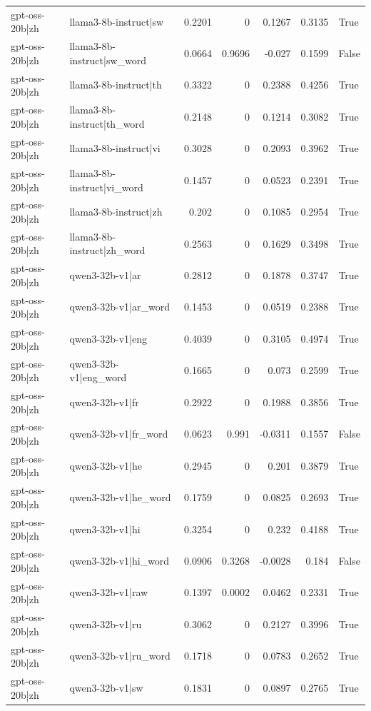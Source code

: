 \begin{table}
\begin{tabular}{l l r r r r l}
gpt-oss-20b|zh & llama3-8b-instruct|sw & 0.2201 & 0 & 0.1267 & 0.3135 & True \\
gpt-oss-20b|zh & llama3-8b-instruct|sw_word & 0.0664 & 0.9696 & -0.027 & 0.1599 & False \\
gpt-oss-20b|zh & llama3-8b-instruct|th & 0.3322 & 0 & 0.2388 & 0.4256 & True \\
gpt-oss-20b|zh & llama3-8b-instruct|th_word & 0.2148 & 0 & 0.1214 & 0.3082 & True \\
gpt-oss-20b|zh & llama3-8b-instruct|vi & 0.3028 & 0 & 0.2093 & 0.3962 & True \\
gpt-oss-20b|zh & llama3-8b-instruct|vi_word & 0.1457 & 0 & 0.0523 & 0.2391 & True \\
gpt-oss-20b|zh & llama3-8b-instruct|zh & 0.202 & 0 & 0.1085 & 0.2954 & True \\
gpt-oss-20b|zh & llama3-8b-instruct|zh_word & 0.2563 & 0 & 0.1629 & 0.3498 & True \\
gpt-oss-20b|zh & qwen3-32b-v1|ar & 0.2812 & 0 & 0.1878 & 0.3747 & True \\
gpt-oss-20b|zh & qwen3-32b-v1|ar_word & 0.1453 & 0 & 0.0519 & 0.2388 & True \\
gpt-oss-20b|zh & qwen3-32b-v1|eng & 0.4039 & 0 & 0.3105 & 0.4974 & True \\
gpt-oss-20b|zh & qwen3-32b-v1|eng_word & 0.1665 & 0 & 0.073 & 0.2599 & True \\
gpt-oss-20b|zh & qwen3-32b-v1|fr & 0.2922 & 0 & 0.1988 & 0.3856 & True \\
gpt-oss-20b|zh & qwen3-32b-v1|fr_word & 0.0623 & 0.991 & -0.0311 & 0.1557 & False \\
gpt-oss-20b|zh & qwen3-32b-v1|he & 0.2945 & 0 & 0.201 & 0.3879 & True \\
gpt-oss-20b|zh & qwen3-32b-v1|he_word & 0.1759 & 0 & 0.0825 & 0.2693 & True \\
gpt-oss-20b|zh & qwen3-32b-v1|hi & 0.3254 & 0 & 0.232 & 0.4188 & True \\
gpt-oss-20b|zh & qwen3-32b-v1|hi_word & 0.0906 & 0.3268 & -0.0028 & 0.184 & False \\
gpt-oss-20b|zh & qwen3-32b-v1|raw & 0.1397 & 0.0002 & 0.0462 & 0.2331 & True \\
gpt-oss-20b|zh & qwen3-32b-v1|ru & 0.3062 & 0 & 0.2127 & 0.3996 & True \\
gpt-oss-20b|zh & qwen3-32b-v1|ru_word & 0.1718 & 0 & 0.0783 & 0.2652 & True \\
gpt-oss-20b|zh & qwen3-32b-v1|sw & 0.1831 & 0 & 0.0897 & 0.2765 & True \\

\end{tabular}
\end{table}
